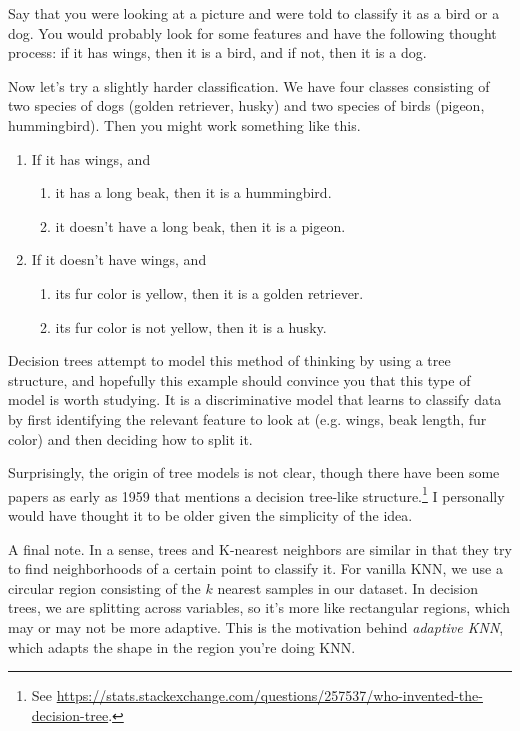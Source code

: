 Say that you were looking at a picture and were told to classify it as a bird or a dog. You would probably look for some features and have the following thought process: if it has wings, then it is a bird, and if not, then it is a dog. 

Now let's try a slightly harder classification. We have four classes consisting of two species of dogs (golden retriever, husky) and two species of birds (pigeon, hummingbird). Then you might work something like this. 
\begin{enumerate}
  \item If it has wings, and 
    \begin{enumerate}
      \item it has a long beak, then it is a hummingbird. 
      \item it doesn't have a long beak, then it is a pigeon. 
    \end{enumerate}
  \item If it doesn't have wings, and 
    \begin{enumerate}
      \item its fur color is yellow, then it is a golden retriever. 
      \item its fur color is not yellow, then it is a husky. 
    \end{enumerate}
\end{enumerate}

Decision trees attempt to model this method of thinking by using a tree structure, and hopefully this example should convince you that this type of model is worth studying. It is a discriminative model that learns to classify data by first identifying the relevant feature to look at (e.g. wings, beak length, fur color) and then deciding how to split it. 

Surprisingly, the origin of tree models is not clear, though there have been some papers as early as 1959 that mentions a decision tree-like structure.\footnote{See \href{https://stats.stackexchange.com/questions/257537/who-invented-the-decision-tree}{https://stats.stackexchange.com/questions/257537/who-invented-the-decision-tree}.} I personally would have thought it to be older given the simplicity of the idea. 

A final note. In a sense, trees and K-nearest neighbors are similar in that they try to find neighborhoods of a certain point to classify it. For vanilla KNN, we use a circular region consisting of the $k$ nearest samples in our dataset. In decision trees, we are splitting across variables, so it's more like rectangular regions, which may or may not be more adaptive. This is the motivation behind \textit{adaptive KNN}, which adapts the shape in the region you're doing KNN. 

